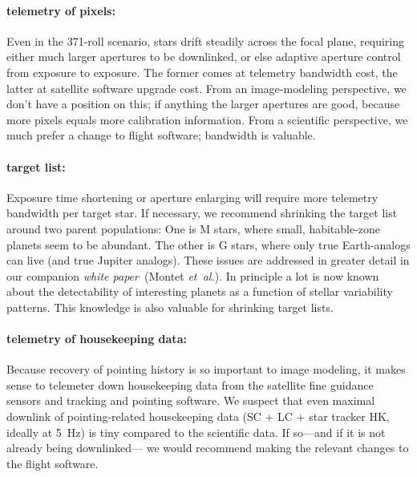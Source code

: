 \documentclass[letterpaper,12pt,whitepaper]{haastex}
\newcommand{\documentname}{\textsl{white paper}}
\newcommand{\foreign}[1]{\textit{#1}}
\newcommand{\etal}{\foreign{et~al.}}
\newcounter{address}
\begin{document}
\paragraph{telemetry of pixels:}
Even in the 371-roll scenario, stars drift steadily across the focal plane,
  requiring either much larger apertures to be downlinked,
  or else adaptive aperture control from exposure to exposure.
The former comes at telemetry bandwidth cost,
  the latter at satellite software upgrade cost.
From an image-modeling perspective, we don't have a position on this;
  if anything the larger apertures are good,
  because more pixels equals more calibration information.
From a scientific perspective, we much prefer a change to flight software;
  bandwidth is valuable.

\paragraph{target list:}
Exposure time shortening or aperture enlarging will require more telemetry bandwidth per target star.
If necessary, we recommend shrinking the target list around two parent populations:
One is M stars, where small, habitable-zone planets seem to be abundant.
The other is G stars, where only true Earth-analogs can live (and true Jupiter analogs).
These issues are addressed in greater detail in our companion \documentname\ (Montet \etal).
In principle a lot is now known about the detectability of interesting planets
  as a function of stellar variability patterns.
This knowledge is also valuable for shrinking target lists.

\paragraph{telemetry of housekeeping data:}
Because recovery of pointing history is so important to image modeling,
  it makes sense to telemeter down housekeeping data from the
  satellite fine guidance sensors and tracking and pointing software.
We suspect that even maximal downlink of pointing-related housekeeping data
  (SC + LC + star tracker HK, ideally at 5~Hz)
  is tiny compared to the scientific data.
If so---and if it is not already being downlinked---%
  we would recommend making the relevant changes to the flight software.
\end{document}
